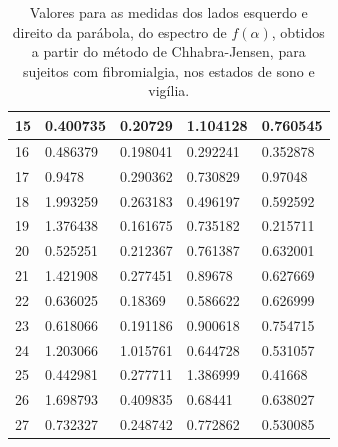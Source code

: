 \documentclass{ufscThesis}
\begin{document}
\begin{table}[h]
\begin{tabular}{|l|l|l|l|l|}
15         & 0.400735     & 0.20729       & 1.104128     & 0.760545      \\ \hline
16         & 0.486379     & 0.198041      & 0.292241     & 0.352878      \\ \hline
17         & 0.9478       & 0.290362      & 0.730829     & 0.97048       \\ \hline
18         & 1.993259     & 0.263183      & 0.496197     & 0.592592      \\ \hline
19         & 1.376438     & 0.161675      & 0.735182     & 0.215711      \\ \hline
20         & 0.525251     & 0.212367      & 0.761387     & 0.632001      \\ \hline
21         & 1.421908     & 0.277451      & 0.89678      & 0.627669      \\ \hline
22         & 0.636025     & 0.18369       & 0.586622     & 0.626999      \\ \hline
23         & 0.618066     & 0.191186      & 0.900618     & 0.754715      \\ \hline
24         & 1.203066     & 1.015761      & 0.644728     & 0.531057      \\ \hline
25         & 0.442981     & 0.277711      & 1.386999     & 0.41668       \\ \hline
26         & 1.698793     & 0.409835      & 0.68441      & 0.638027      \\ \hline
27         & 0.732327     & 0.248742      & 0.772862     & 0.530085      \\ \hline
\end{tabular}
\caption{Valores para as medidas dos lados esquerdo e direito da parábola, do espectro de $f(\alpha)$, obtidos a partir do método de Chhabra-Jensen, para sujeitos com fibromialgia, nos estados de sono e vigília.}
\label{tab_lados_fm}
\end{table}
\end{document}
